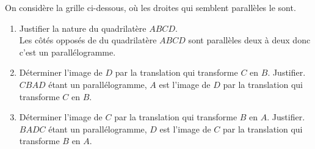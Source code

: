 \begin{corrige}
    On considère la grille ci-dessous, où les droites qui semblent parallèles le sont.

    \Reseau[%
        Colonnes=5,%
        Lignes=8,%
        Traces={%
            pair A,B,C,D,E,F,G,H; %
            A=ppreseau(0,8);
            B=ppreseau(1,8);
            C=ppreseau(1,7);
            D=ppreseau(0,7);
            E=ppreseau(2,5);
            F=ppreseau(1,2);
            G=ppreseau(3,2);
            H=ppreseau(4,6);
            marque_p:="croix";
            drawoptions(withcolor red);
            pointe(A,B,C,D,E,F,G,H);
            label.urt(btex $A$ etex,A);
            label.urt(btex $B$ etex,B);
            label.urt(btex $C$ etex,C);
            label.urt(btex $D$ etex,D);
            label.urt(btex $E$ etex,E);
            label.urt(btex $F$ etex,F);
            label.urt(btex $G$ etex,G);
            label.urt(btex $H$ etex,H);
            drawoptions();
        }]{}
    \begin{enumerate}
        \item Justifier la nature du quadrilatère $ABCD$.\\
        {\red Les côtés opposés de du quadrilatère $ABCD$ sont parallèles deux à deux donc c'est un parallélogramme.}        
        \item Déterminer l'image de $D$ par la translation qui transforme $C$ en $B$. Justifier.\\
        {\red $CBAD$ étant un parallélogramme, $A$ est l'image de $D$ par la translation qui transforme $C$ en $B$.}
        \item Déterminer l'image de $C$ par la translation qui transforme $B$ en $A$. Justifier.\\
        {\red $BADC$ étant un parallélogramme, $D$ est l'image de $C$ par la translation qui transforme $B$ en $A$.}
    \end{enumerate}
\end{corrige}

